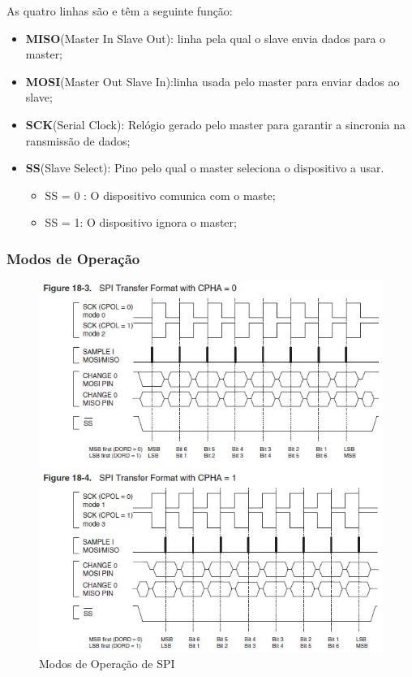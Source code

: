 \documentclass[10pt,a4paper]{paper}
\begin{document}
As quatro linhas são e têm a seguinte função:
\begin{itemize}
\item \textbf{MISO}(Master In Slave Out): linha pela qual o slave envia dados para o master;
\item \textbf{MOSI}(Master Out Slave In):linha usada pelo master para enviar dados ao slave;
\item \textbf{SCK}(Serial Clock): Relógio gerado pelo master para garantir a sincronia na ransmissão de dados;
\item\textbf{SS}(Slave Select):  Pino pelo qual o master seleciona o dispositivo a usar.
	\begin{itemize}
	\item SS = 0 : O dispositivo comunica com o maste;
	\item SS = 1: O dispositivo ignora o master;
	\end{itemize}
\end{itemize}

\subsubsection*{Modos de Operação}

 	\begin{figure}[ht]
		\includegraphics[scale=0.5]{fig11.jpg}
		\centering
		\caption {Modos de Operação de SPI}
		\label{fig:figura11}
	\end{figure}
\end{document}
